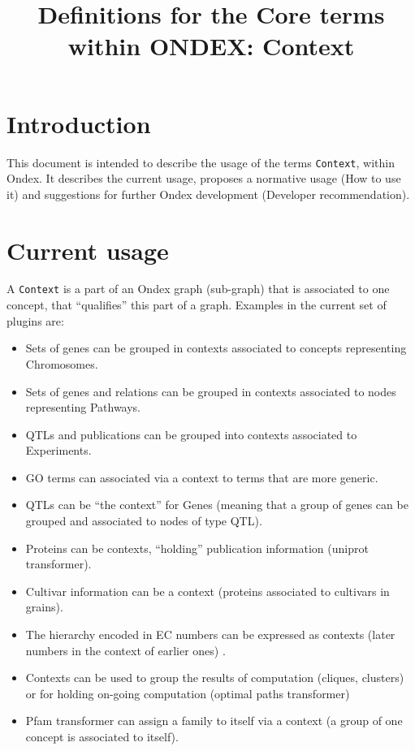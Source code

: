 \documentclass[a4paper,10pt]{article}
\title{Definitions for the Core terms within ONDEX: Context}
\newcommand{\term}[1]{\texttt{#1}\xspace}
\newcommand{\cxt}{\term{Context}}
\begin{document}
\maketitle

\section{Introduction}

This document is intended to describe the usage of the terms \cxt,  within Ondex. It describes the current usage, proposes a normative usage (How to use it) and suggestions for further Ondex development (Developer recommendation). 


\section{Current usage}
A \cxt is a part of an Ondex graph (sub-graph) that is associated to one concept, that ``qualifies'' this part of a graph. Examples in the current set of plugins are:

\begin{itemize}

\item Sets of genes can be grouped in contexts associated to concepts representing Chromosomes.
\item Sets of genes and relations can be grouped in contexts associated to nodes representing Pathways.
\item QTLs and publications can be grouped into contexts associated to Experiments.
\item GO terms can associated via a context to terms that are more generic.
\item QTLs can be ``the context'' for Genes (meaning that a group of genes can be grouped and associated to nodes of type QTL).
\item Proteins can be contexts, ``holding'' publication information (uniprot transformer).
\item Cultivar information can be a context (proteins associated to cultivars in grains).
\item The hierarchy encoded in EC numbers can be expressed as contexts (later numbers in the context of earlier ones)	.
\item Contexts can be used to group the results of computation (cliques, clusters) or for holding on-going computation (optimal paths transformer)
\item Pfam transformer can assign a family to itself via a context (a group of one concept is associated to itself).

\end{itemize}
\end{document}

